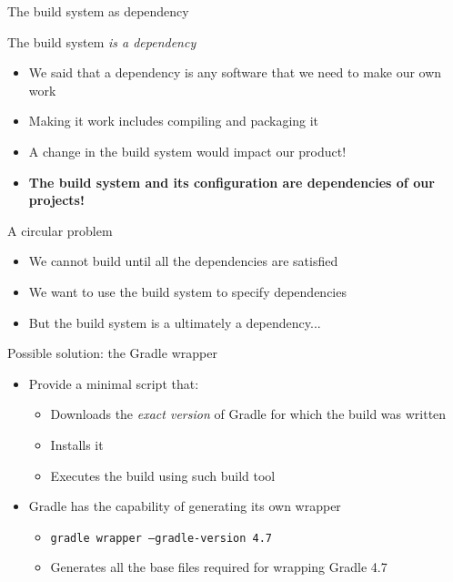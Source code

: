 \documentclass[presentation]{beamer}
\begin{document}
\begin{frame}{The build system as dependency}
    \begin{block}{The build system \textit{is a dependency}}
        \begin{itemize}
            \item We said that a dependency is any software that we need to make our own work
            \item Making it work includes compiling and packaging it
            \item A change in the build system would impact our product!
            \item \textbf{The build system and its configuration are dependencies of our projects!}
        \end{itemize}
    \end{block}
    \begin{block}{A circular problem}
        \begin{itemize}
            \item We cannot build until all the dependencies are satisfied
            \item We want to use the build system to specify dependencies
            \item But the build system is a ultimately a dependency...
        \end{itemize}
    \end{block}
    \begin{block}{Possible solution: the Gradle wrapper}
        \begin{itemize}
            \item Provide a minimal script that:
            \begin{itemize}
                \item Downloads the \textit{exact version} of Gradle for which the build was written
                \item Installs it
                \item Executes the build using such build tool
            \end{itemize}
            \item Gradle has the capability of generating its own wrapper
            \begin{itemize}
                \item \texttt{gradle wrapper --gradle-version 4.7}
                \item Generates all the base files required for wrapping Gradle 4.7

\end{itemize}
\end{itemize}
\end{block}
\end{frame}
\end{document}
